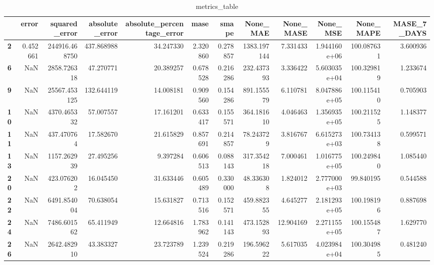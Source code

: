 \begin{table}[h]
\centering
\caption{metrics_table}
\label{table:Final tune for dataset 1 lstm global unviariate. After smape fix}
\begin{tabular}{lrrrrrrrrrrr}
\toprule
{} &     error &  squared\_error &  absolute\_error &  absolute\_percentage\_error &      mase &     smape &     None\_MAE &  None\_MASE &      None\_MSE &   None\_MAPE &  MASE\_7\_DAYS \\
\midrule
\textbf{2 } &  0.452661 &  244916.468750 &      437.868988 &                  34.247330 &  2.320860 &  0.278857 &  1383.197144 &   7.331433 &  1.944160e+06 &  100.087631 &     3.600936 \\
\textbf{6 } &       NaN &    2858.726318 &       47.270771 &                  20.389257 &  0.678528 &  0.216286 &   232.437393 &   3.336422 &  5.603035e+04 &  100.329819 &     1.233674 \\
\textbf{9 } &       NaN &   25567.453125 &      132.644119 &                  14.008181 &  0.909560 &  0.154286 &   891.155579 &   6.110781 &  8.047886e+05 &  100.115410 &     0.705903 \\
\textbf{10} &       NaN &    4370.465332 &       57.007557 &                  17.161201 &  0.633417 &  0.155571 &   364.181610 &   4.046463 &  1.356935e+05 &  100.211525 &     1.148377 \\
\textbf{11} &       NaN &     437.470764 &       17.582670 &                  21.615829 &  0.857691 &  0.214857 &    78.243729 &   3.816767 &  6.615273e+03 &  100.734138 &     0.599571 \\
\textbf{13} &       NaN &    1157.262939 &       27.495256 &                   9.397284 &  0.606513 &  0.088143 &   317.354218 &   7.000461 &  1.016775e+05 &  100.249840 &     1.085440 \\
\textbf{20} &       NaN &     423.076202 &       16.045450 &                  31.633446 &  0.605489 &  0.330000 &    48.336308 &   1.824012 &  2.777000e+03 &   99.840195 &     0.544588 \\
\textbf{22} &       NaN &    6491.854004 &       70.638054 &                  15.631827 &  0.713516 &  0.152571 &   459.882355 &   4.645277 &  2.181293e+05 &  100.198196 &     0.887698 \\
\textbf{24} &       NaN &    7486.601562 &       65.411949 &                  12.664816 &  1.783962 &  0.141143 &   473.152893 &  12.904169 &  2.271155e+05 &  100.155487 &     1.629770 \\
\textbf{26} &       NaN &    2642.482910 &       43.383327 &                  23.723789 &  1.239524 &  0.219286 &   196.596222 &   5.617035 &  4.023984e+04 &  100.304985 &     0.481240 \\

\end{tabular}
\end{table}
